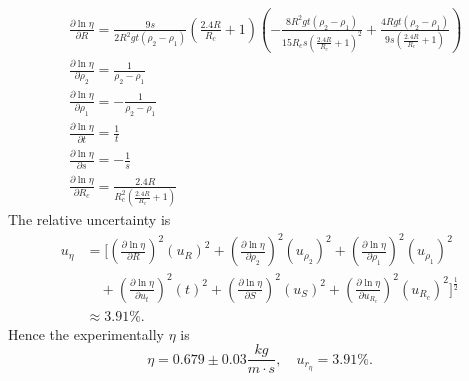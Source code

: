     \[
    \begin{split}
        &\frac{\partial\ln\eta}{\partial R}=\frac{9 s}{2 R^{2} g t \left(\rho_{2} - \rho_{1}\right)} \left(\frac{2.4 R}{R_{c}} + 1\right) \left(- \frac{8 R^{2} g t \left(\rho_{2} - \rho_{1}\right)}{15R_{c} s \left(\frac{2.4 R}{R_{c}} + 1\right)^{2}} + \frac{4 R g t \left(\rho_{2} - \rho_{1}\right)}{9s \left(\frac{2.4 R}{R_{c}} + 1\right)}\right)\\
        &\frac{\partial\ln\eta}{\partial \rho_2}=\frac{1}{\rho_2-\rho_1}\\
        &\frac{\partial\ln\eta}{\partial \rho_1}=-\frac{1}{\rho_2-\rho_1}\\
        &\frac{\partial\ln\eta}{\partial t}=\frac{1}{t}\\
        &\frac{\partial\ln\eta}{\partial s}=-\frac{1}{s}\\
        &\frac{\partial\ln\eta}{\partial R_c}=\frac{2.4 R}{R_{c}^{2} \left(\frac{2.4 R}{R_{c}} + 1\right)}
    \end{split}
    \]
    The relative uncertainty is
    \[
    \begin{split}
        u_{\eta}&=[(\frac{\partial\ln\eta}{\partial R})^2(u_R)^2+(\frac{\partial\ln\eta}{\partial \rho_2})^2(u_{\rho_2})^2+(\frac{\partial\ln\eta}{\partial \rho_1})^2(u_{\rho_1})^2\\
        &\quad+(\frac{\partial\ln\eta}{\partial u_t})^2(t)^2+(\frac{\partial\ln\eta}{\partial S})^2(u_S)^2+(\frac{\partial\ln\eta}{\partial u_{R_c}})^2(u_{R_c})^2]^\frac{1}{2}\\
        &\approx 3.91\%.
    \end{split}
    \]
    Hence the experimentally $\eta$ is
    \[
        \eta=0.679\pm 0.03\frac{kg}{m\cdot s}, \quad u_{r_{\eta}}=3.91\%.
    \]
